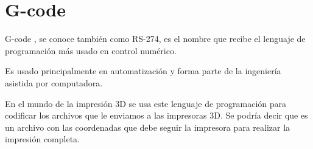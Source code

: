 \section{G-code}

G-code \cite{wiki:gcode}, se conoce también como RS-274, es el nombre que recibe el lenguaje de programación más usado en control numérico.

Es usado principalmente en automatización y forma parte de la ingeniería asistida por computadora.

En el mundo de la impresión 3D se usa este lenguaje de programación para codificar los archivos que le enviamos a las impresoras 3D. Se podría decir que es un archivo con las coordenadas que debe seguir la impresora para realizar la impresión completa.



